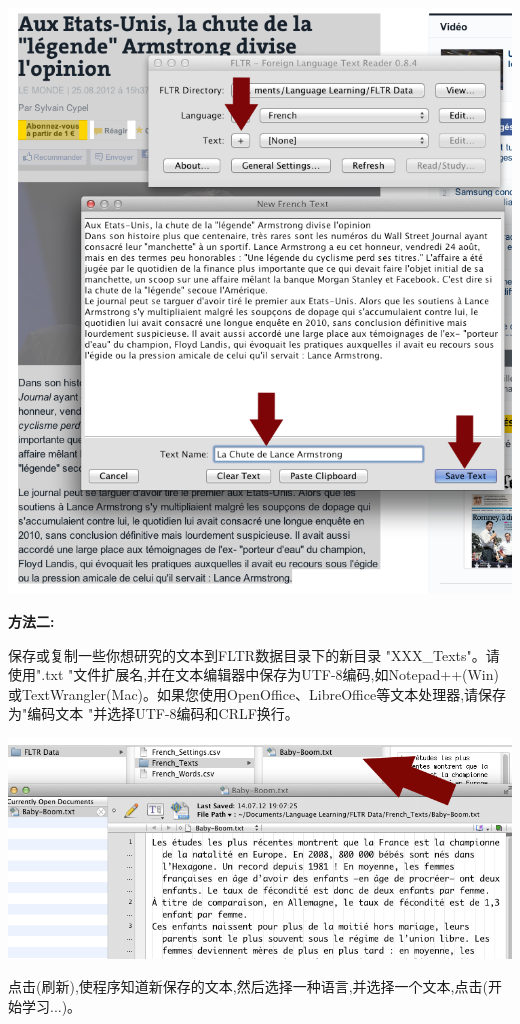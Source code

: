 \documentclass[cn,10pt,math=newtx,citestyle=gb7714-2015,bibstyle=gb7714-2015]{elegantbook}
\begin{document}
\includegraphics[scale=0.5]{image/images-035.png}

\textbf{方法二:}

保存或复制一些你想研究的文本到FLTR数据目录下的新目录 "XXX\_Texts"。请使用".txt "文件扩展名,并在文本编辑器中保存为UTF-8编码,如Notepad++(Win)或TextWrangler(Mac)。如果您使用OpenOffice、LibreOffice等文本处理器,请保存为"编码文本 "并选择UTF-8编码和CRLF换行。

\includegraphics[scale=0.5]{image/images-037.png}

点击(刷新),使程序知道新保存的文本,然后选择一种语言,并选择一个文本,点击(开始学习...)。
\end{document}
